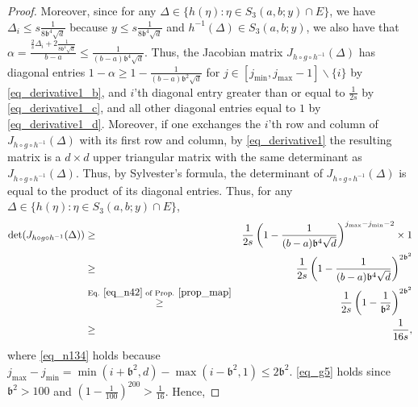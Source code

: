 \documentclass[11pt,letterpaper]{article}
\begin{document}
\begin{proof}
\noindent
%
Moreover, since for any $\Delta \in  \{h(\eta) :  \eta \in  S_3(a,b;y) \cap E \}$,  we have $\Delta_i \leq s\frac{1}{8\mathfrak{b}^4\sqrt{d} }$ because $y \leq s\frac{1}{8\mathfrak{b}^4\sqrt{d} }$ and $h^{-1}(\Delta) \in  S_3(a,b;y)$, we also have that $\alpha= \frac{ \frac{2}{s}\Delta_i +2\frac{1}{8\mathfrak{b}^4\sqrt{d}} }{b-a} \leq  \frac{1}{(b-a)\mathfrak{b}^4\sqrt{d}}$.
%
Thus, the Jacobian matrix $J_{h \circ g \circ h^{-1}}(\Delta)$  has diagonal entries $1-\alpha \geq 1- \frac{1}{(b-a)\mathfrak{b}^2\sqrt{d}}$ for $j \in  [j_{\mathrm{min}}, j_{\mathrm{max}}-1] \backslash \{i\}$ by \eqref{eq_derivative1_b},  and $i$'th diagonal entry greater than or equal to $\frac{1}{2s}$ by \eqref{eq_derivative1_c}, and all other diagonal entries equal to $1$ by \eqref{eq_derivative1_d}.
%
%
Moreover, if one exchanges the $i$'th row and column of $J_{h \circ g \circ h^{-1}}(\Delta)$ with its first row and column,  by \eqref{eq_derivative1} the resulting matrix is a  $d\times d$ upper triangular matrix with the same determinant as  $J_{h \circ g \circ h^{-1}}(\Delta)$.
%
Thus, by Sylvester's formula, the determinant of $J_{h \circ g \circ h^{-1}}(\Delta)$ is equal to the product of its diagonal entries.
%
 Thus, for any $\Delta \in  \{h(\eta) :  \eta \in  S_3(a,b;y) \cap E \}$,
%
\begin{eqnarray}
\mathrm{det}(J_{h \circ g \circ h^{-1}}(\Delta)) &\geq &\frac{1}{2s} \left(1- \frac{1}{(b-a)\mathfrak{b}^4\sqrt{d}}\right)^{j_{\mathrm{max}} - j_{\mathrm{min}}- 2} \times 1 \nonumber\\
%
&\geq & \frac{1}{2s} \left(1- \frac{1}{(b-a)\mathfrak{b}^4\sqrt{d}}\right)^{2 \mathfrak{b}^2} \label{eq_n134}\\
%
%
%
&\stackrel{\textrm{Eq. } \eqref{eq_n42} \textrm{ of Prop. } \ref{prop_map}}{\geq}& \frac{1}{2s}\left(1- \frac{1}{\mathfrak{b}^2}\right)^{2 \mathfrak{b}^2} \nonumber\\
%
&\geq &\frac{1}{16 s}, \label{eq_g5}
\end{eqnarray}
%
%
where \eqref{eq_n134} holds because $j_{\mathrm{max}}-j_{\mathrm{min}} =  \min(i+\mathfrak{b}^2, d) - \max(i-\mathfrak{b}^2, 1) \leq 2 \mathfrak{b}^2$.
%
\eqref{eq_g5} holds since $\mathfrak{b}^2 >100$ and $(1-\frac{1}{100})^{200} > \frac{1}{16}$. 
%
Hence,


\end{proof}
\end{document}
